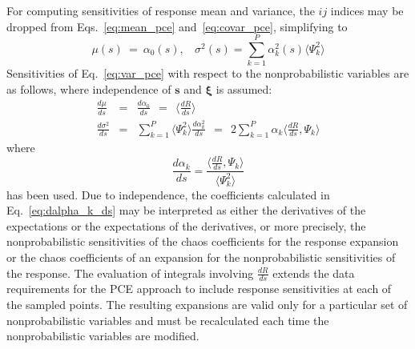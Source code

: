 \noindent For computing sensitivities of response mean and variance,
the $ij$ indices may be dropped from Eqs.~\ref{eq:mean_pce}
and~\ref{eq:covar_pce}, simplifying to
\begin{equation}
\mu(s) ~=~ \alpha_0(s), ~~~~\sigma^2(s) = \sum_{k=1}^P \alpha^2_k(s) \langle \Psi^2_k \rangle \label{eq:var_pce}
\end{equation}
Sensitivities of Eq.~\ref{eq:var_pce} with 
respect to the nonprobabilistic variables are as follows, where 
independence of $\boldsymbol{s}$ and $\boldsymbol{\xi}$ is assumed:
\begin{eqnarray}
\frac{d\mu}{ds} &=& \frac{d\alpha_0}{ds} ~~=~~ 
\langle \frac{dR}{ds} \rangle \label{eq:dmuR_ds_xi_pce} \\
\frac{d\sigma^2}{ds} &=& \sum_{k=1}^P \langle \Psi_k^2 \rangle 
\frac{d\alpha_k^2}{ds} ~~=~~ 
2 \sum_{k=1}^P \alpha_k \langle \frac{dR}{ds}, \Psi_k \rangle 
\label{eq:dsigR_ds_xi_pce}
\end{eqnarray}
where
\begin{equation}
\frac{d\alpha_k}{ds} = \frac{\langle \frac{dR}{ds}, \Psi_k \rangle}
{\langle \Psi^2_k \rangle} \label{eq:dalpha_k_ds}
\end{equation}
has been used.  Due to independence, the coefficients calculated in
Eq.~\ref{eq:dalpha_k_ds} may be interpreted as either the derivatives
of the expectations or the expectations of the derivatives, or more
precisely, the nonprobabilistic sensitivities of the chaos
coefficients for the response expansion or the chaos coefficients of
an expansion for the nonprobabilistic sensitivities of the response.
The evaluation of integrals involving $\frac{dR}{ds}$ extends the data
requirements for the PCE approach to include response sensitivities at
each of the sampled points.%
The resulting expansions are valid only for a particular set of 
nonprobabilistic variables and must be recalculated each time the 
nonprobabilistic variables are modified.

